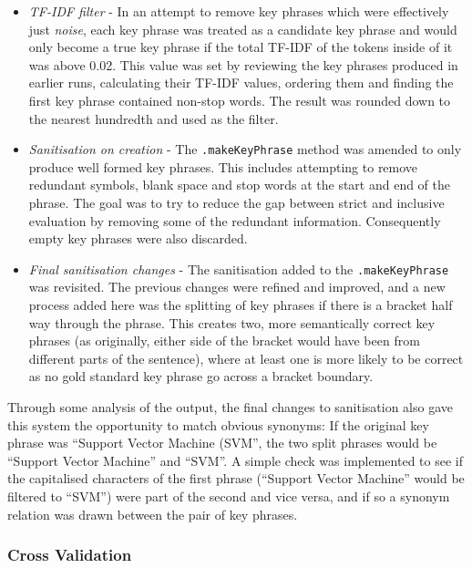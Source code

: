 \begin{itemize}
	\item \textit{TF-IDF filter} - In an attempt to remove key phrases which were effectively just \textit{noise}, each key phrase was treated as a candidate key phrase and would only become a true key phrase if the total TF-IDF of the tokens inside of it was above 0.02. This value was set by reviewing the key phrases produced in earlier runs, calculating their TF-IDF values, ordering them and finding the first key phrase contained non-stop words. The result was rounded down to the nearest hundredth and used as the filter.
	\item \textit{Sanitisation on creation} - The \texttt{.makeKeyPhrase} method was amended to only produce well formed key phrases. This includes attempting to remove redundant symbols, blank space and stop words at the start and end of the phrase. The goal was to try to reduce the gap between strict and inclusive evaluation by removing some of the redundant information. Consequently empty key phrases were also discarded.
	\item \textit{Final sanitisation changes} - The sanitisation added to the \texttt{.makeKeyPhrase} was revisited. The previous changes were refined and improved, and a new process added here was the splitting of key phrases if there is a bracket half way through the phrase. This creates two, more semantically correct key phrases (as originally, either side of the bracket would have been from different parts of the sentence), where at least one is more likely to be correct as no gold standard key phrase go across a bracket boundary. 
\end{itemize}

Through some analysis of the output, the final changes to sanitisation also gave this system the opportunity to match obvious synonyms: If the original key phrase was ``Support Vector Machine (SVM'', the two split phrases would be ``Support Vector Machine'' and ``SVM''. A simple check was implemented to see if the capitalised characters of the first phrase (``Support Vector Machine'' would be filtered to ``SVM'') were part of the second and vice versa, and if so a synonym relation was drawn between the pair of key phrases. 

\subsubsection*{Cross Validation}

